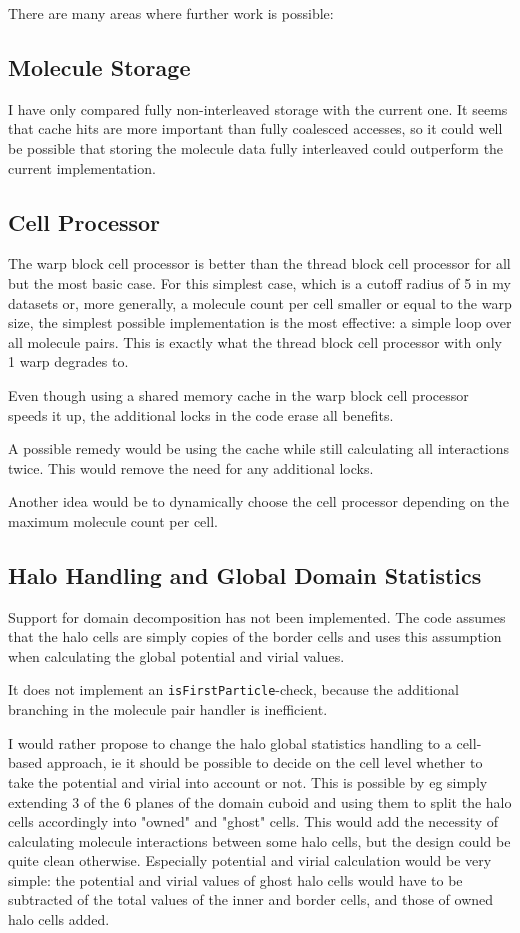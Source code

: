 There are many areas where further work is possible:

\subsection{Molecule Storage}
I have only compared fully non-interleaved storage with the current one. It seems that cache hits are more important than fully coalesced accesses, so it could well be possible that storing the molecule data fully interleaved could outperform the current implementation.

\subsection{Cell Processor}
The warp block cell processor is better than the thread block cell processor for all but the most basic case.
For this simplest case, which is a cutoff radius of 5 in my datasets or, more generally, a molecule count per cell smaller or equal to the warp size, the simplest possible implementation is the most effective: a simple loop over all molecule pairs. This is exactly what the thread block cell processor with only 1 warp degrades to.

Even though using a shared memory cache in the warp block cell processor speeds it up, the additional locks in the code erase all benefits.

A possible remedy would be using the cache while still calculating all interactions twice. This would remove the need for any additional locks.

Another idea would be to dynamically choose the cell processor depending on the maximum molecule count per cell.

\subsection{Halo Handling and Global Domain Statistics}
Support for domain decomposition has not been implemented. The code assumes that the halo cells are simply copies of the border cells and uses this assumption when calculating the global potential and virial values.

It does not implement an \lstinline!isFirstParticle!-check, because the additional branching in the molecule pair handler is inefficient.

I would rather propose to change the halo global statistics handling to a cell-based approach, ie it should be possible to decide on the cell level whether to take the potential and virial into account or not.
This is possible by eg simply extending 3 of the 6 planes of the domain cuboid and using them to split the halo cells accordingly into "owned" and "ghost" cells. This would add the necessity of calculating molecule interactions between some halo cells, but the design could be quite clean otherwise. Especially potential and virial calculation would be very simple: the potential and virial values of ghost halo cells would have to be subtracted of the total values of the inner and border cells, and those of owned halo cells added.

